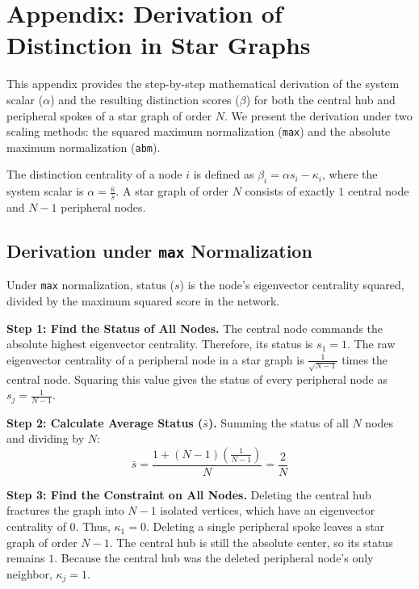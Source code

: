 \section*{Appendix: Derivation of Distinction in Star Graphs}
\label{sec:appendix_proofs}

This appendix provides the step-by-step mathematical derivation of the system scalar ($\alpha$) and the resulting distinction scores ($\beta$) for both the central hub and peripheral spokes of a star graph of order $N$. We present the derivation under two scaling methods: the squared maximum normalization (\texttt{max}) and the absolute maximum normalization (\texttt{abm}).

The distinction centrality of a node $i$ is defined as $\beta_i = \alpha s_i - \kappa_i$, where the system scalar is $\alpha = \frac{\bar{\kappa}}{\bar{s}}$. A star graph of order $N$ consists of exactly $1$ central node and $N-1$ peripheral nodes.

\subsection*{Derivation under \texttt{max} Normalization}

Under \texttt{max} normalization, status ($s$) is the node's eigenvector centrality squared, divided by the maximum squared score in the network.

\textbf{Step 1: Find the Status of All Nodes.}
The central node commands the absolute highest eigenvector centrality. Therefore, its status is $s_1 = 1$. The raw eigenvector centrality of a peripheral node in a star graph is $\frac{1}{\sqrt{N-1}}$ times the central node. Squaring this value gives the status of every peripheral node as $s_j = \frac{1}{N-1}$.

\textbf{Step 2: Calculate Average Status ($\bar{s}$).}
Summing the status of all $N$ nodes and dividing by $N$:
\begin{equation}
    \bar{s} = \frac{1 + (N-1)\left(\frac{1}{N-1}\right)}{N} = \frac{2}{N}
\end{equation}

\textbf{Step 3: Find the Constraint on All Nodes.}
Deleting the central hub fractures the graph into $N-1$ isolated vertices, which have an eigenvector centrality of $0$. Thus, $\kappa_1 = 0$. Deleting a single peripheral spoke leaves a star graph of order $N-1$. The central hub is still the absolute center, so its status remains $1$. Because the central hub was the deleted peripheral node's only neighbor, $\kappa_j = 1$.

